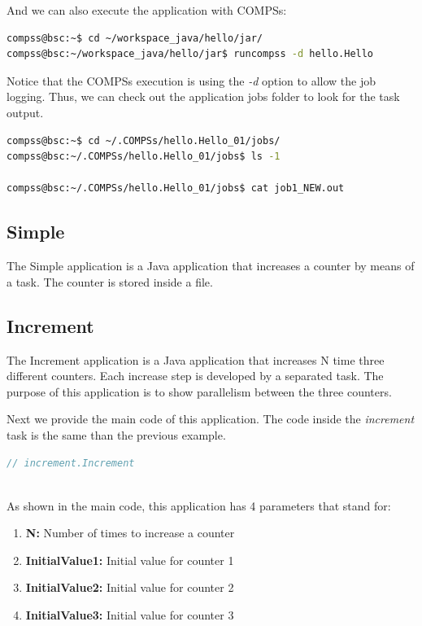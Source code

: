 And we can also execute the application with COMPSs:

\begin{lstlisting}[language=bash]
compss@bsc:~$ cd ~/workspace_java/hello/jar/
compss@bsc:~/workspace_java/hello/jar$ runcompss -d hello.Hello 
\end{lstlisting}

Notice that the COMPSs execution is using the \textit{-d} option to allow the job logging. Thus, we can check out the application jobs folder to look for
the task output.

\begin{lstlisting}[language=bash]
compss@bsc:~$ cd ~/.COMPSs/hello.Hello_01/jobs/
compss@bsc:~/.COMPSs/hello.Hello_01/jobs$ ls -1

compss@bsc:~/.COMPSs/hello.Hello_01/jobs$ cat job1_NEW.out

\end{lstlisting}

\subsection{Simple}
The Simple application is a Java application that increases a counter by means of a task. The counter is stored inside a file.


\subsection{Increment}
The Increment application is a Java application that increases N time three different counters. Each increase step is developed by a separated task. The
purpose of this application is to show parallelism between the three counters.

Next we provide the main code of this application. The code inside the \textit{increment} task is the same than the previous example. 

\begin{lstlisting}[language=java]
	// increment.Increment
	
\end{lstlisting}

As shown in the main code, this application has 4 parameters that stand for:

\begin{enumerate}
 \item \textbf{N:} Number of times to increase a counter
 \item \textbf{InitialValue1:} Initial value for counter 1
 \item \textbf{InitialValue2:} Initial value for counter 2
 \item \textbf{InitialValue3:} Initial value for counter 3
\end{enumerate}

